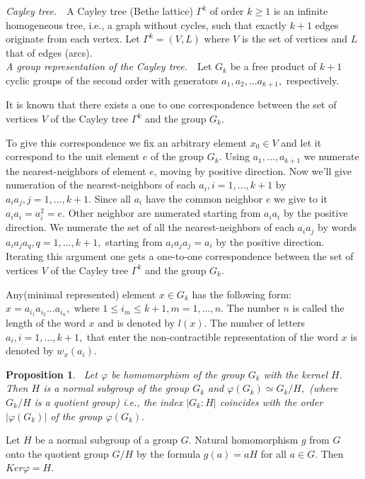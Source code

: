 \documentclass[12pt,reqno]{amsart}
\newtheorem{pro}{Proposition}
\numberwithin{equation}{section}
\begin{document}
   {\it Cayley tree.}   \,\  A Cayley tree (Bethe lattice) $\Gamma^k$ of order $k\geq 1$ is an infinite
homogeneous tree, i.e., a graph without cycles, such that exactly
$k+1$ edges originate from each vertex. Let $\Gamma^k=(V,L)$ where
$V$ is the set of vertices and $L$ that of edges (arcs).\\

{\it A group representation of the Cayley tree.} \,\ Let $G_{k}$
be a free product of $k+1$ cyclic groups of the second order with
generators $a_{1},a_{2},...a_{k+1},$ respectively.

 It is known that there exists a one to one correspondence between
the set of vertices $V$ of the Cayley tree $\Gamma^{k}$ and the
group $G_{k}$.

To give this correspondence we fix an arbitrary element $x_{0}\in
V$ and let it correspond to the unit element $e$ of the group
$G_{k}.$ Using $a_{1},...,a_{k+1}$ we numerate the
nearest-neighbors of element $e$, moving by positive direction.
Now we'll give numeration of the nearest-neighbors of each $a_{i},
i=1,...,k+1$ by $a_{i}a_{j}, j=1,...,k+1$. Since all $a_{i}$ have
the common neighbor $e$ we give to it $a_{i}a_{i}=a_{i}^{2}=e.$
Other neighbor are numerated starting from $a_{i}a_{i}$ by the
positive direction. We numerate the set of all the
nearest-neighbors of each $a_{i}a_{j}$ by words $a_{i}a_{j}a_{q},
q=1,...,k+1,$ starting from $a_{i}a_{j}a_{j}=a_{i}$ by the
positive direction. Iterating this argument one gets a one-to-one
correspondence between the set of vertices $V$ of the Cayley tree
$\Gamma^{k}$ and the group $G_{k}.$

 Any(minimal represented) element $x\in G_{k}$ has the following form:
\,\ $x=a_{i_{1}}a_{i_{2}}...a_{i_{n}},$ where $1\leq i_{m}\leq
k+1, m=1,...,n.$  The number $n$ is called the length of the word
$x$ and is denoted by $l(x).$  The number of letters $a_{i},
i=1,...,k+1,$ that enter the non-contractible representation of
the word $x$ is denoted by $w_{x}(a_{i}).$

\begin{pro}\label{p1}\cite{2} \ Let $\varphi$ be homomorphism of the group
$G_{k}$ with the kernel $H.$ Then $H$ is a normal subgroup of the
group $G_{k}$ and $\varphi(G_{k})\simeq G_{k}/H,$ (where $G_{k}/H$
is a quotient group) i.e., the index $|G_{k}:H|$ coincides with
the order $|\varphi(G_{k})|$ of the group $\varphi(G_{k}).$
\end{pro}
 Let $H$ be a normal subgroup of a group $G$. Natural
homomorphism $g$ from $G$ onto the quotient group $G/H$ by the
formula $g(a)=aH$ for all $a\in G.$ Then $Ker\varphi=H.$
\end{document}
